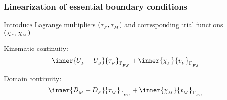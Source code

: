 \begin{frame}
  \frametitle{Linearization of essential boundary conditions}

  Introduce Lagrange multipliers $(\tau_{_{F}}, \tau_{_{M}})$ and corresponding
  trial functions $(\chi_{_{F}}, \chi_{_{M}})$

  \bigskip

  Kinematic continuity:
  \begin{displaymath}
     \inner{\UF - \PS}{\tauF}_{\GammaFS} + \inner{\chiF}{\vF}_{\GammaFS}
  \end{displaymath}

  Domain continuity:
  \begin{displaymath}
     \inner{\DM - \DS}{\tauM}_{\GammaFS} + \inner{\chiM}{\vM}_{\GammaFS}
  \end{displaymath}

\end{frame}
